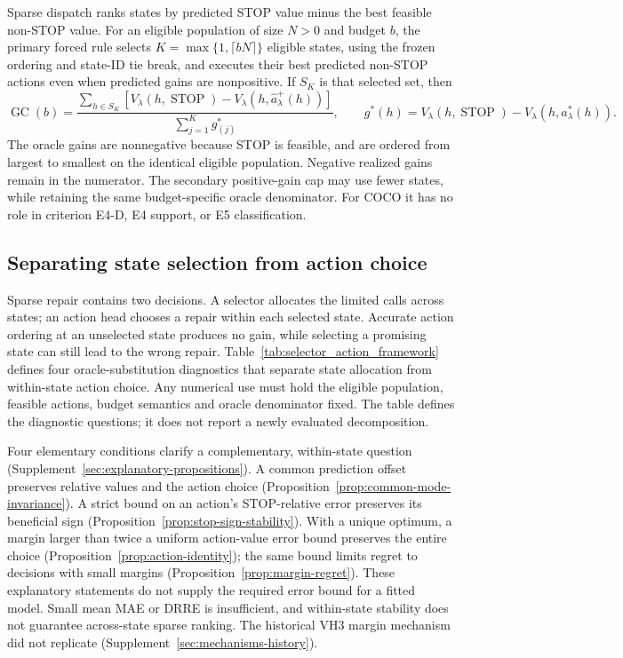 Sparse dispatch ranks states by predicted STOP value minus the best feasible
non-STOP value. For an eligible population of size $N>0$ and budget $b$,
the primary forced rule selects
$K=\max\{1,\lceil bN\rceil\}$ eligible states, using the frozen ordering and
state-ID tie break, and executes their best predicted non-STOP actions even
when predicted gains are nonpositive. If $S_K$ is that selected set, then
\begin{equation}
 \operatorname{GC}(b)=
 \frac{\sum_{h\in S_K}[V_\lambda(h,\operatorname{STOP})-
                          V_\lambda(h,\widehat a^+_\lambda(h))]}
      {\sum_{j=1}^{K}g^*_{(j)}},\qquad
 g^*(h)=V_\lambda(h,\operatorname{STOP})-V_\lambda(h,a^*_\lambda(h)).
 \label{eq:unified-gain-capture}
\end{equation}
The oracle gains are nonnegative because STOP is feasible, and are ordered
from largest to smallest on the identical eligible population. Negative
realized gains remain in the numerator. The secondary positive-gain cap may
use fewer states, while retaining the same budget-specific oracle denominator.
For COCO it has no role in criterion E4-D, E4 support, or E5 classification.

\subsection{Separating state selection from action choice}
\label{sec:selector-action-diagnosis}
Sparse repair contains two decisions. A selector allocates the limited calls
across states; an action head chooses a repair within each selected state.
Accurate action ordering at an unselected state produces no gain, while
selecting a promising state can still lead to the wrong repair.
Table~\ref{tab:selector_action_framework} defines four oracle-substitution
diagnostics that separate state allocation from within-state action choice.
Any numerical use must hold the eligible population, feasible actions,
budget semantics and oracle denominator fixed. The table defines the
diagnostic questions; it does not report a newly evaluated decomposition.

Four elementary conditions clarify a complementary, within-state question
(Supplement~\ref{sec:explanatory-propositions}). A common prediction offset
preserves relative values and the action choice
(Proposition~\ref{prop:common-mode-invariance}). A strict bound on an action's
STOP-relative error preserves its beneficial sign
(Proposition~\ref{prop:stop-sign-stability}). With a unique optimum, a margin
larger than twice a uniform action-value error bound preserves the entire
choice (Proposition~\ref{prop:action-identity}); the same bound limits regret
to decisions with small margins (Proposition~\ref{prop:margin-regret}).
These explanatory statements do not supply the required error
bound for a fitted model. Small mean MAE or DRRE is insufficient, and
within-state stability does not guarantee across-state sparse ranking.
The historical VH3 margin mechanism did not replicate
(Supplement~\ref{sec:mechanisms-history}).
